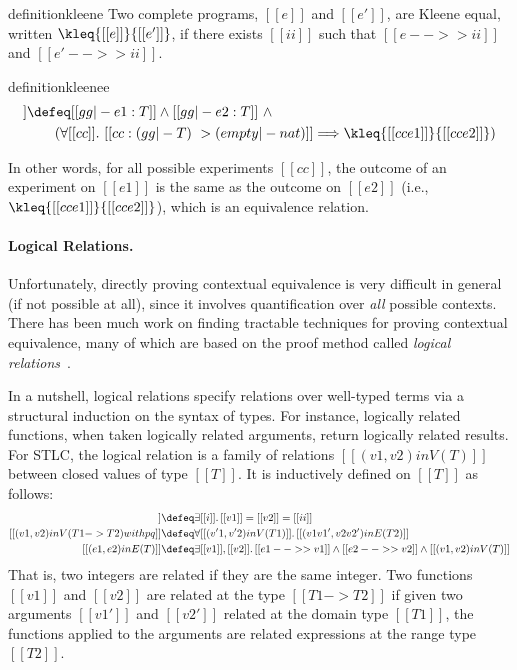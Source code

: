\begin{restatable}{definition}{kleene}
  Two complete programs, $[[e]]$ and $[[e']]$, are Kleene equal, written
  $\kleq{[[e]]}{[[e']]}$, if there exists $[[ii]]$ such that $[[e -->> ii]]$ and $[[e' -->> ii]]$.
\end{restatable}


\begin{restatable}{definition}{kleenee}  \label{def:cxtx}%
  \begin{align*}
    [[gg |- e1 ~= e2 : T]]  & \defeq [[gg |- e1 : T]] \land [[gg |- e2 : T]] \ \land \\
                                 & \qquad (\forall [[cc]].\ [[cc : (gg |- T) ~> (empty |- nat)]]  \Longrightarrow \kleq{[[cc{e1}]]}{[[cc{e2}]]})
  \end{align*}
\end{restatable}

In other words, for all possible experiments $[[ cc ]]$, the outcome of an
experiment on $[[e1]]$ is the same as the outcome on $[[e2]]$
(i.e., $\kleq{[[cc{e1}]]}{[[cc{e2}]]}$), which is an equivalence relation.


\paragraph{Logical Relations.}

Unfortunately, directly proving contextual equivalence is very difficult in
general (if not possible at all), since it involves quantification over
\emph{all} possible contexts. There has been much work on finding tractable
techniques for proving contextual equivalence, many of which are based on the
proof method called \emph{logical relations}~\citep{tait, plotkin1973lambda, statman1985logical}.

In a nutshell, logical relations specify relations over well-typed terms via a
structural induction on the syntax of types. For instance, logically related
functions, when taken logically related arguments, return logically related
results. For STLC, the logical relation is a family of relations $[[ (v1, v2) in V(T)  ]]$
between closed values of type $[[T]]$. It is inductively defined on $[[T]]$ as follows:
\begin{align*}
  [[(v1 , v2) in V ( nat ) with pq ]]  &\defeq  \exists [[i]].\, [[v1]] = [[v2]] = [[ii]] \\
  [[(v1 , v2) in V ( T1 -> T2 ) with pq ]]  & \defeq  \forall [[(v'1, v'2) in V (T1)  ]].\, [[  (v1 v1' , v2 v2') in E (T2)  ]] \\
  [[(e1, e2) in E (T)  ]] & \defeq \exists [[v1]], [[v2]].\, [[e1 -->> v1]] \land [[e2 -->> v2]] \land [[(v1, v2) in V (T) ]]
\end{align*}
That is, two integers are related if they are the same integer. Two functions
$[[v1]]$ and $[[v2]]$ are related at the type $[[T1 -> T2]]$ if given two
arguments $[[v1']]$ and $[[v2']]$ related at the domain type $[[T1]]$, the
functions applied to the arguments are related expressions at the range type
$[[T2]]$.


